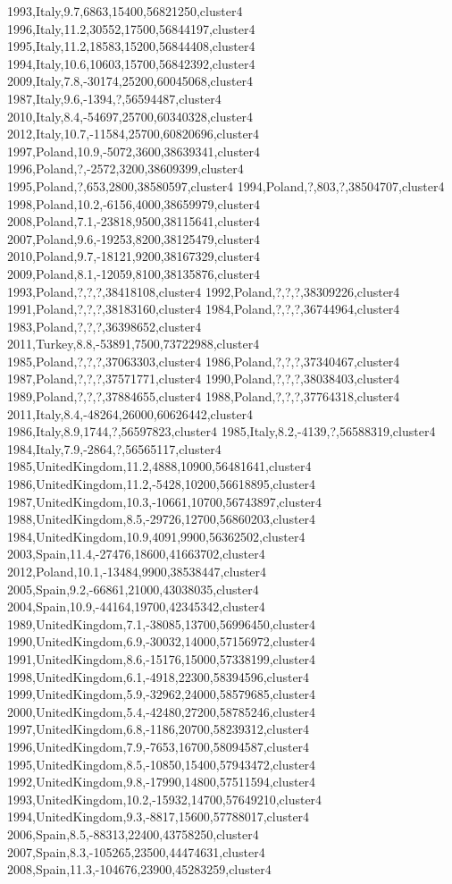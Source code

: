 1993,Italy,9.7,6863,15400,56821250,cluster4
1996,Italy,11.2,30552,17500,56844197,cluster4
1995,Italy,11.2,18583,15200,56844408,cluster4
1994,Italy,10.6,10603,15700,56842392,cluster4
2009,Italy,7.8,-30174,25200,60045068,cluster4
1987,Italy,9.6,-1394,?,56594487,cluster4
2010,Italy,8.4,-54697,25700,60340328,cluster4
2012,Italy,10.7,-11584,25700,60820696,cluster4
1997,Poland,10.9,-5072,3600,38639341,cluster4
1996,Poland,?,-2572,3200,38609399,cluster4
1995,Poland,?,653,2800,38580597,cluster4
1994,Poland,?,803,?,38504707,cluster4
1998,Poland,10.2,-6156,4000,38659979,cluster4
2008,Poland,7.1,-23818,9500,38115641,cluster4
2007,Poland,9.6,-19253,8200,38125479,cluster4
2010,Poland,9.7,-18121,9200,38167329,cluster4
2009,Poland,8.1,-12059,8100,38135876,cluster4
1993,Poland,?,?,?,38418108,cluster4
1992,Poland,?,?,?,38309226,cluster4
1991,Poland,?,?,?,38183160,cluster4
1984,Poland,?,?,?,36744964,cluster4
1983,Poland,?,?,?,36398652,cluster4
2011,Turkey,8.8,-53891,7500,73722988,cluster4
1985,Poland,?,?,?,37063303,cluster4
1986,Poland,?,?,?,37340467,cluster4
1987,Poland,?,?,?,37571771,cluster4
1990,Poland,?,?,?,38038403,cluster4
1989,Poland,?,?,?,37884655,cluster4
1988,Poland,?,?,?,37764318,cluster4
2011,Italy,8.4,-48264,26000,60626442,cluster4
1986,Italy,8.9,1744,?,56597823,cluster4
1985,Italy,8.2,-4139,?,56588319,cluster4
1984,Italy,7.9,-2864,?,56565117,cluster4
1985,UnitedKingdom,11.2,4888,10900,56481641,cluster4
1986,UnitedKingdom,11.2,-5428,10200,56618895,cluster4
1987,UnitedKingdom,10.3,-10661,10700,56743897,cluster4
1988,UnitedKingdom,8.5,-29726,12700,56860203,cluster4
1984,UnitedKingdom,10.9,4091,9900,56362502,cluster4
2003,Spain,11.4,-27476,18600,41663702,cluster4
2012,Poland,10.1,-13484,9900,38538447,cluster4
2005,Spain,9.2,-66861,21000,43038035,cluster4
2004,Spain,10.9,-44164,19700,42345342,cluster4
1989,UnitedKingdom,7.1,-38085,13700,56996450,cluster4
1990,UnitedKingdom,6.9,-30032,14000,57156972,cluster4
1991,UnitedKingdom,8.6,-15176,15000,57338199,cluster4
1998,UnitedKingdom,6.1,-4918,22300,58394596,cluster4
1999,UnitedKingdom,5.9,-32962,24000,58579685,cluster4
2000,UnitedKingdom,5.4,-42480,27200,58785246,cluster4
1997,UnitedKingdom,6.8,-1186,20700,58239312,cluster4
1996,UnitedKingdom,7.9,-7653,16700,58094587,cluster4
1995,UnitedKingdom,8.5,-10850,15400,57943472,cluster4
1992,UnitedKingdom,9.8,-17990,14800,57511594,cluster4
1993,UnitedKingdom,10.2,-15932,14700,57649210,cluster4
1994,UnitedKingdom,9.3,-8817,15600,57788017,cluster4
2006,Spain,8.5,-88313,22400,43758250,cluster4
2007,Spain,8.3,-105265,23500,44474631,cluster4
2008,Spain,11.3,-104676,23900,45283259,cluster4
